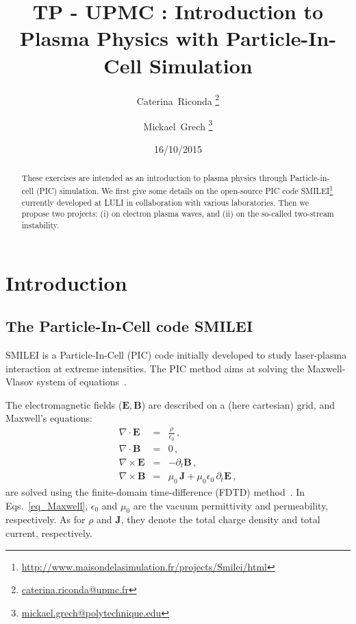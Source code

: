 \documentclass[11pt,a4paper]{article}
\newcommand{\vE}{\mathbf{E}}
\newcommand{\vB}{\mathbf{B}}
\newcommand{\vJ}{\mathbf{J}}
\begin{document}
\title{TP - UPMC : Introduction to Plasma Physics with Particle-In-Cell Simulation}


\author{Caterina~Riconda \footnote{\url{caterina.riconda@upmc.fr}} \and Mickael~Grech \footnote{\url{mickael.grech@polytechnique.edu}}}

\date{16/10/2015}

\maketitle              


\begin{abstract}
These exercises are intended as an introduction to plasma physics through Particle-in-cell (PIC) simulation.
We first give some details on the open-source PIC code SMILEI\footnote{\url{http://www.maisondelasimulation.fr/projects/Smilei/html}} currently developed at LULI in collaboration with various laboratories.
Then we propose two projects: (i) on electron plasma waves, and (ii) on the so-called two-stream instability.
\end{abstract}




\section*{Introduction}\label{intro}

\subsection*{The Particle-In-Cell code SMILEI}

SMILEI is a Particle-In-Cell (PIC) code initially developed to study laser-plasma interaction at extreme intensities. 
The PIC method aims at solving the Maxwell-Vlasov system of  equations~\cite{birdsall_langdon}.

The electromagnetic fields ($\vE,\vB$) are described on a (here cartesian) grid, and Maxwell's equations:
\begin{subequations}\label{eq_Maxwell}
\begin{eqnarray}
\nabla \cdot \vE &=& \frac{\rho}{\epsilon_0} \,,\\
\nabla \cdot \vB &=& 0 \,,\\
\nabla \times \vE &=& -\partial_t \vB \,,\\
\nabla \times \vB &=& \mu_0\, \vJ + \mu_0 \epsilon_0\,\partial_t \vE \,,
\end{eqnarray}
\end{subequations}
are solved using the finite-domain time-difference (FDTD) method~\cite{taflove_2005}.
In Eqs.~\eqref{eq_Maxwell}, $\epsilon_0$ and $\mu_0$ are the vacuum permittivity and permeability, respectively. 
As for $\rho$ and $\vJ$, they denote the total charge density and total current, respectively.
\end{document}
